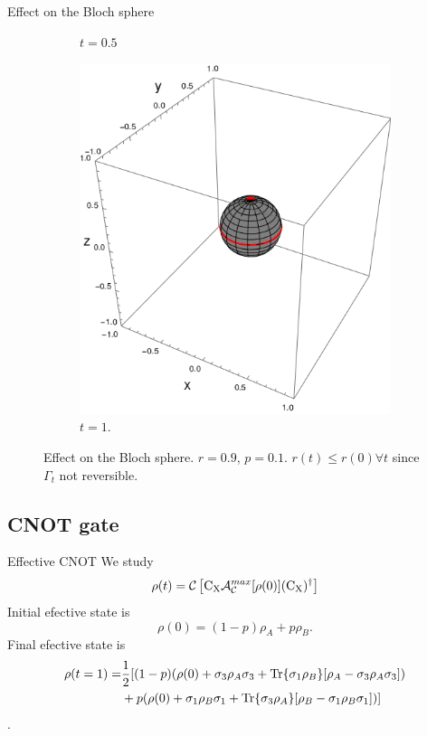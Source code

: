 \begin{frame}{Effect on the Bloch sphere}
\begin{figure}[h!]
\begin{subfigure}{0.32\textwidth}
            \caption{$t=0.5$}
        \end{subfigure}
        \begin{subfigure}{0.32\textwidth}
            \centering
            \includegraphics[width=0.9\linewidth]{figures/sphere_swapcontraction_t=1.0_z=0.9_p=0.9.png}
            \caption{$t=1.$}
        \end{subfigure}
        \caption{Effect on the Bloch sphere. $r=0.9$, $p=0.1$. $r(t)\leq r(0) \forall t$ since $\Gamma_{t}$ not reversible.}
    \end{figure}
\end{frame}

\subsection{CNOT gate}

\begin{frame}{Effective CNOT}
    We study
    \begin{equation*}
        \rho(t)=\mathcal{C}\left[\text{C}_{\text{X}} \mathcal{A}_{\mathcal{C}}^{max}[\rho(0)](\text{C}_{\text{X}})^{\dag}\right]
    \end{equation*}
    Initial efective state is
    \begin{equation*}
        \rho(0)=(1-p)\rho_{A}+p\rho_{B}.
    \end{equation*}
    Final efective state is
    \begin{align*}
        \rho(t=1)=&\frac{1}{2}[(1-p)(\rho(0)+\sigma_{3}\rho_{A}\sigma_{3}+\Tr{\sigma_{1}\rho_{B}}[\rho_{A}-\sigma_{3}\rho_{A}\sigma_{3}])\\
        &+p(\rho(0)+\sigma_{1}\rho_{B}\sigma_{1}+\Tr{\sigma_{3}\rho_{A}}[\rho_{B}-\sigma_{1}\rho_{B}\sigma_{1}])]
    \end{align*}.
\end{frame}

